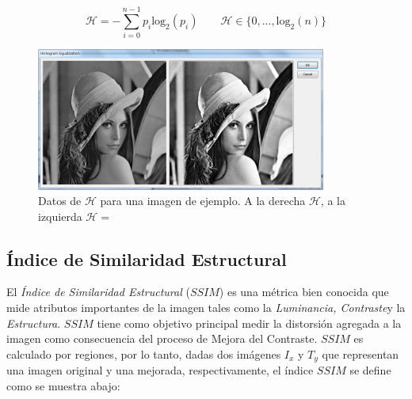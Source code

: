\begin{equation}
\mathscr{H}\label{symbol:entropia}= -\sum_{i=0}^{n-1} p_i \text{log}_2(p_i) \qquad \mathscr{H} \in \{0,...,\text{log}_2(n)\}
\end{equation}

\begin{figure}[H]
\centering
    \includegraphics[width=0.85\textwidth]{./Figures/lennaejemplo.jpg}
        \caption{Datos de $\mathscr{H}$ para una imagen de ejemplo. A la derecha $\mathscr{H}$, a la izquierda $\mathscr{H}=$}
        \label{fig:lenaejemploentropia}
\end{figure}

\subsection{Índice de Similaridad Estructural}

El \textit{Índice de Similaridad Estructural} ($SSIM$) \cite{wang2004image} es una métrica bien conocida que mide atributos importantes de la imagen tales como la \textit{Luminancia, Contraste}y la \textit{Estructura}. $SSIM$ tiene como objetivo principal medir la distorsión agregada a la imagen como consecuencia del proceso de Mejora del Contraste. $SSIM$ es calculado por regiones, por lo tanto, dadas dos imágenes $I_x$ y $T_y$ que representan una imagen original y una mejorada, respectivamente, el índice $SSIM$ se define como se muestra abajo: 


